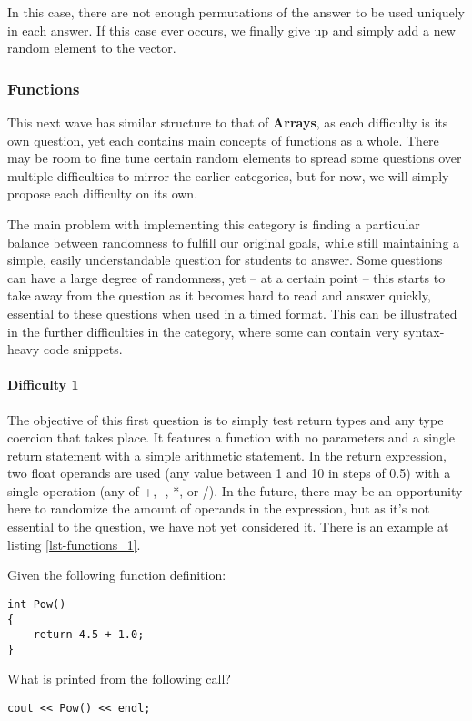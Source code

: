 \documentclass{article}
\begin{document}
In this case, there are not enough permutations of the answer to be used uniquely in each answer. If this case ever occurs, we finally give up and simply add a new random element to the 
vector.

\subsubsection{Functions} \label{subsubsec-functions}

This next wave has similar structure to that of \textbf{Arrays}, as each difficulty is its own question, yet each contains main concepts of functions as a whole. There may be room to fine tune certain 
random elements to spread some questions over multiple difficulties to mirror the earlier categories, but for now, we will simply propose each difficulty on its own. 

The main problem with implementing this category is finding a particular balance between randomness to fulfill our original goals, while still maintaining a simple, easily understandable question for students to answer. Some questions can have a large degree of randomness, yet -- at a certain point -- this starts to take away from the question as it becomes hard to read and answer quickly, essential to these questions when used in a timed format. This can be illustrated in the further difficulties in the category, where some can contain very syntax-heavy code snippets.

\paragraph{Difficulty 1} \hfill \par

The objective of this first question is to simply test return types and any type coercion that takes place. It features a function with no parameters and a single return statement with a simple arithmetic statement. In the return expression, two float operands are used (any value between 1 and 10 in steps of 0.5) with a single operation (any of +, -, *, or /). In the future, there may be an opportunity here to randomize the amount of operands in the expression, but as it's not essential to the question, we have not yet considered it. There is an example at listing \ref{lst-functions_1}.

\begin{VerbCM}
Given the following function definition:
\end{VerbCM}
\begin{lstlisting}
int Pow() 
{ 
	return 4.5 + 1.0; 
}
\end{lstlisting}
\begin{VerbCM}
What is printed from the following call? 
\end{VerbCM}
\begin{lstlisting}[caption={\textbf{Functions} Difficulty 1 Example}, label=lst-functions_1]
cout << Pow() << endl; 
\end{lstlisting}
\end{document}
